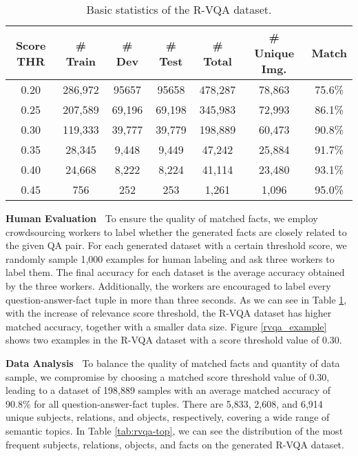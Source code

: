 \documentclass[sigconf]{acmart}
\begin{document}
\begin{table}[ht]
	\centering 
\footnotesize
	\begin{tabular}{*7{c}} 
		\toprule	
		Score THR	& \# Train 	& \# Dev 	& \# Test  	& \# Total 	& \# Unique Img. & Match  \\
		\midrule
		0.20		& 286,972	& 95657 	& 95658 	& 478,287 	& 78,863    & 75.6\% 	\\		
		0.25		& 207,589	& 69,196	& 69,198 	& 345,983  	& 72,993 	& 86.1\% 	\\	
		0.30		& 119,333	& 39,777 	& 39,779 	& 198,889   & 60,473  	& 90.8\% 	\\	
		0.35		& 28,345	& 9,448 	& 9,449 	& 47,242    & 25,884	& 91.7\% 		\\	
		0.40		& 24,668	& 8,222		& 8,224		& 41,114	& 23,480 	& 93.1\% 	\\	
		0.45		& 756		& 252		& 253		& 1,261  	& 1,096  	& 95.0\% 	\\	
		\bottomrule		
	\end{tabular}
	\caption{Basic statistics of the R-VQA dataset.}
	\label{tab:rvqa-data}
\end{table}





\textbf{Human Evaluation~} To ensure the quality of matched facts, we employ crowdsourcing workers to label whether the generated facts are closely related to the given QA pair.
For each generated dataset with a certain threshold score, we randomly sample 1,000 examples for human labeling and ask three workers to label them.
The final accuracy for each dataset is the average accuracy obtained by the three workers.
Additionally, the workers are encouraged to label every question-answer-fact tuple in more than three seconds.
As we can see in Table \ref{tab:rvqa-data}, with the increase of relevance score threshold, the R-VQA dataset has higher matched accuracy,
together with a smaller data size. Figure \ref{rvqa_example} shows two examples in the R-VQA dataset with a score threshold value of 0.30.

 

\textbf{Data Analysis~} To balance the quality of matched facts and quantity of data sample, we compromise by choosing a matched score threshold value of 0.30, leading to a dataset of 198,889 samples with an average matched accuracy of 90.8\% for all question-answer-fact tuples. 
There are 5,833, 2,608, and 6,914 unique subjects, relations, and objects, respectively, covering a wide range of semantic topics.
In Table \ref{tab:rvqa-top}, we can see the distribution of the most frequent subjects, relations, objects, and facts on the generated R-VQA dataset.
\end{document}
